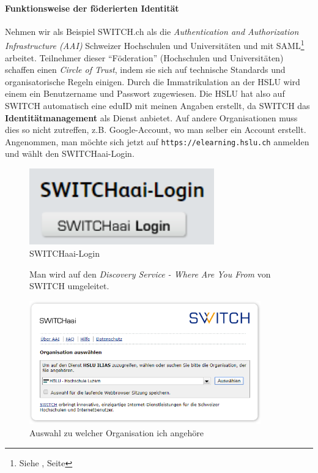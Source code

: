 \documentclass[10pt,a4paper]{article}
\begin{document}
\paragraph*{Funktionsweise der föderierten Identität}Nehmen wir als Beispiel SWITCH.ch als die \textsl{Authentication and Authorization Infrastructure (AAI)} Schweizer Hochschulen und Universitäten und mit SAML\footnote{{Siehe \underline{}, Seite \pageref{saml}}} arbeitet. Teilnehmer dieser "`Föderation"' (Hochschulen und Universitäten) schaffen einen \textsl{Circle of Trust}, indem sie sich auf technische Standards und organisatorische Regeln einigen. Durch die Immatrikulation an der HSLU wird einem ein Benutzername und Passwort zugewiesen. Die HSLU hat also auf SWITCH automatisch eine eduID mit meinen Angaben erstellt, da SWITCH das \textbf{Identitätmanagement} als Dienst anbietet. Auf andere Organisationen muss dies so nicht zutreffen, z.B. Google-Account, wo man selber ein Account erstellt. Angenommen, man möchte sich jetzt auf \texttt{https://elearning.hslu.ch} anmelden und wählt den SWITCHaai-Login.
\begin{figure}[H]
    \begin{center}
    \includegraphics[width=8cm]{images/switchaai0.png}
    \caption{SWITCHaai-Login}
    \label{switchaai0}
    \end{center}
\end{figure}

\begin{figure}[H]
    Man wird auf den \textsl{Discovery Service - Where Are You From} von SWITCH umgeleitet.
    \begin{center}
    \includegraphics[width=10cm]{images/switchaai1.png}
    \caption{Auswahl zu welcher Organisation ich angehöre}
    \label{sitchaai1}
    \end{center}
\end{figure}
\end{document}
